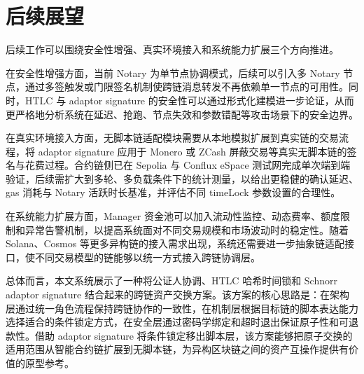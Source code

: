 \section{后续展望}


后续工作可以围绕安全性增强、真实环境接入和系统能力扩展三个方向推进。

在安全性增强方面，当前 Notary 为单节点协调模式，后续可以引入多 Notary 节点，通过多签触发或门限签名机制使跨链消息转发不再依赖单一节点的可用性。同时，HTLC 与 adaptor signature 的安全性可以通过形式化建模进一步论证，从而更严格地分析系统在延迟、抢跑、节点失效和参数错配等攻击场景下的安全边界。

在真实环境接入方面，无脚本链适配模块需要从本地模拟扩展到真实链的交易流程，将 adaptor signature 应用于 Monero 或 ZCash 屏蔽交易等真实无脚本链的签名与花费过程。合约链侧已在 Sepolia 与 Conflux eSpace 测试网完成单次端到端验证，后续需扩大到多轮、多负载条件下的统计测量，以给出更稳健的确认延迟、gas 消耗与 Notary 活跃时长基准，并评估不同 timeLock 参数设置的合理性。

在系统能力扩展方面，Manager 资金池可以加入流动性监控、动态费率、额度限制和异常告警机制，以提高系统面对不同交易规模和市场波动时的稳定性。随着 Solana、Cosmos 等更多异构链的接入需求出现，系统还需要进一步抽象链适配接口，使不同交易模型的链能够以统一方式接入跨链协调层。

总体而言，本文系统展示了一种将公证人协调、HTLC 哈希时间锁和 Schnorr adaptor signature 结合起来的跨链资产交换方案。该方案的核心思路是：在架构层通过统一角色流程保持跨链协作的一致性，在机制层根据目标链的脚本表达能力选择适合的条件锁定方式，在安全层通过密码学绑定和超时退出保证原子性和可退款性。借助 adaptor signature 将条件锁定移出脚本层，该方案能够把原子交换的适用范围从智能合约链扩展到无脚本链，为异构区块链之间的资产互操作提供有价值的原型参考。

